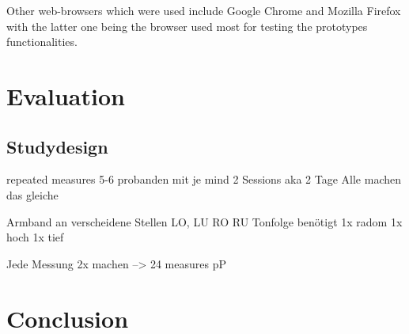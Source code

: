 Other web-browsers which were used include Google Chrome and Mozilla Firefox with the latter one being the browser used most for testing the prototypes functionalities.

\section{Evaluation}
\subsection{Studydesign}
repeated measures
5-6 probanden mit je mind 2 Sessions aka 2 Tage
Alle machen das gleiche 

Armband an verscheidene Stellen
LO, LU RO RU
Tonfolge benötigt 
1x radom 1x hoch 1x tief

Jede Messung 2x machen
--> 24 measures pP

\section{Conclusion}
